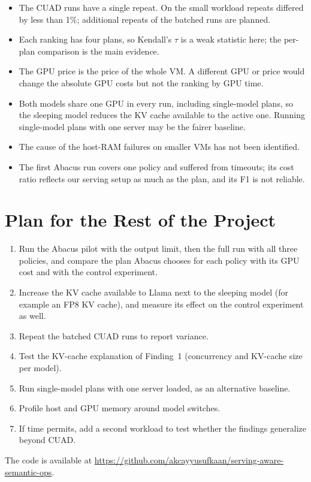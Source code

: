 \documentclass[11pt,a4paper]{article}
\begin{document}
\begin{itemize}\itemsep0em
\item The CUAD runs have a single repeat. On the small workload repeats differed by less than 1\%;
additional repeats of the batched runs are planned.
\item Each ranking has four plans, so Kendall's $\tau$ is a weak statistic here; the per-plan
comparison is the main evidence.
\item The GPU price is the price of the whole VM. A different GPU or price would change the absolute
GPU costs but not the ranking by GPU time.
\item Both models share one GPU in every run, including single-model plans, so the sleeping model
reduces the KV cache available to the active one. Running single-model plans with one server may be
the fairer baseline.
\item The cause of the host-RAM failures on smaller VMs has not been identified.
\item The first Abacus run covers one policy and suffered from timeouts; its cost ratio reflects
our serving setup as much as the plan, and its F1 is not reliable.
\end{itemize}

\section{Plan for the Rest of the Project}\label{sec:plan}

\begin{enumerate}\itemsep0em
\item Run the Abacus pilot with the output limit, then the full run with all three policies, and
compare the plan Abacus chooses for each policy with its GPU cost and with the control experiment.
\item Increase the KV cache available to Llama next to the sleeping model (for example an FP8 KV
cache), and measure its effect on the control experiment as well.
\item Repeat the batched CUAD runs to report variance.
\item Test the KV-cache explanation of Finding~1 (concurrency and KV-cache size per model).
\item Run single-model plans with one server loaded, as an alternative baseline.
\item Profile host and GPU memory around model switches.
\item If time permits, add a second workload to test whether the findings generalize beyond CUAD.
\end{enumerate}

The code is available at \url{https://github.com/akcayyusufkaan/serving-aware-semantic-ops}.



\end{document}
